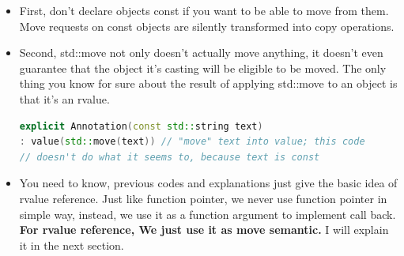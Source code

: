 \documentclass[a4paper,12pt,twoside]{book}
\begin{document}
\begin{itemize}
\item First, don't declare objects const if you want to be able to move from them. Move requests on const objects are silently transformed into copy operations.

\item Second, std::move not only doesn't actually move anything, it doesn't even guarantee that the object it's casting will be eligible to be moved. The only thing you know for sure about the result of applying std::move to an object is that it's an rvalue.

\begin{lstlisting}[frame=single, language=c++]
explicit Annotation(const std::string text)
: value(std::move(text)) // "move" text into value; this code
// doesn't do what it seems to, because text is const
\end{lstlisting}


\item You need to know,  previous codes and explanations just give the basic idea of rvalue reference. Just like function pointer, we never use function pointer in simple way, instead, we use it as a function argument to implement call back.  \textbf{For rvalue reference, We just use it as move semantic.} I will explain it in the next section.

\end{itemize}
\end{document}
